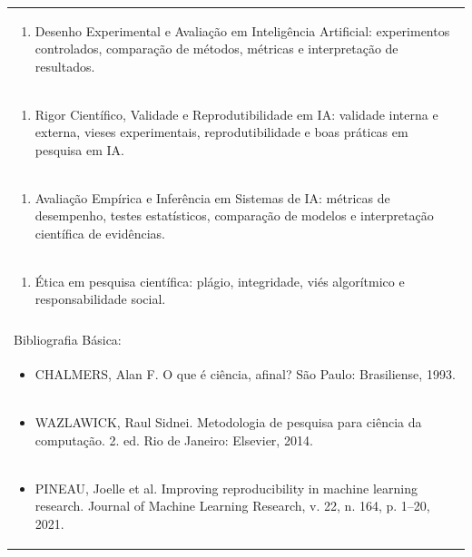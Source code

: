 \documentclass[11pt]{article}
\begin{document}
\begin{center}
\begin{longtable}{|p{4cm}|p{4cm}|p{4cm}|p{4cm}|}
\multicolumn{4}{|p{\dimexpr 16cm + 6\tabcolsep\relax}|}{\begin{enumerate}[start=8]\item Desenho Experimental e Avaliação em Inteligência Artificial: experimentos controlados, comparação de métodos, métricas e interpretação de resultados.\end{enumerate}}\\
\multicolumn{4}{|p{\dimexpr 16cm + 6\tabcolsep\relax}|}{\begin{enumerate}[start=9]\item Rigor Científico, Validade e Reprodutibilidade em IA: validade interna e externa, vieses experimentais, reprodutibilidade e boas práticas em pesquisa em IA.\end{enumerate}}\\
\multicolumn{4}{|p{\dimexpr 16cm + 6\tabcolsep\relax}|}{\begin{enumerate}[start=10]\item Avaliação Empírica e Inferência em Sistemas de IA: métricas de desempenho, testes estatísticos, comparação de modelos e interpretação científica de evidências.\end{enumerate}}\\
\multicolumn{4}{|p{\dimexpr 16cm + 6\tabcolsep\relax}|}{\begin{enumerate}[start=11]\item Ética em pesquisa científica: plágio, integridade, viés algorítmico e responsabilidade social.\end{enumerate}}\\
\multicolumn{4}{|p{\dimexpr 16cm + 6\tabcolsep\relax}|}{}\\
\hline
\multicolumn{4}{|p{16cm}|}{Bibliografia Básica:}\\*
\multicolumn{4}{|p{\dimexpr 16cm + 6\tabcolsep\relax}|}{\begin{itemize}\item CHALMERS, Alan F. O que é ciência, afinal? São Paulo: Brasiliense, 1993.\end{itemize}}\\
\multicolumn{4}{|p{\dimexpr 16cm + 6\tabcolsep\relax}|}{\begin{itemize}\item WAZLAWICK, Raul Sidnei. Metodologia de pesquisa para ciência da computação. 2. ed. Rio de Janeiro: Elsevier, 2014.\end{itemize}}\\
\multicolumn{4}{|p{\dimexpr 16cm + 6\tabcolsep\relax}|}{\begin{itemize}\item PINEAU, Joelle et al. Improving reproducibility in machine learning research. Journal of Machine Learning Research, v. 22, n. 164, p. 1–20, 2021.\end{itemize}}\\

\end{longtable}
\end{center}
\end{document}
